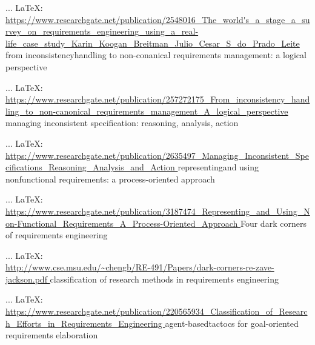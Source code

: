 \begin{thebibliography}{99}
 ... \LaTeX:\\ \url{https://www.researchgate.net/publication/2548016_The_world's_a_stage_a_survey_on_requirements_engineering_using_a_real-life_case_study_Karin_Koogan_Breitman_Julio_Cesar_S_do_Prado_Leite }
from inconsistencyhandling to non-conanical requirements management: a logical perspective

 ... \LaTeX:\\ \url{https://www.researchgate.net/publication/257272175_From_inconsistency_handling_to_non-canonical_requirements_management_A_logical_perspective }
managing inconsistent specification: reasoning, analysis, action

 ... \LaTeX:\\ \url{https://www.researchgate.net/publication/2635497_Managing_Inconsistent_Specifications_Reasoning_Analysis_and_Action  }
representingand using nonfunctional requirements: a process-oriented approach

 ... \LaTeX:\\ \url{https://www.researchgate.net/publication/3187474_Representing_and_Using_Non-Functional_Requirements_A_Process-Oriented_Approach }
Four dark corners of requirements engineering

 ... \LaTeX:\\ \url{ http://www.cse.msu.edu/~chengb/RE-491/Papers/dark-corners-re-zave-jackson.pdf }
classification of research methods in requirements engineering

 ... \LaTeX:\\ \url{https://www.researchgate.net/publication/220565934_Classification_of_Research_Efforts_in_Requirements_Engineering }
agent-basedtactocs for goal-oriented requirements elaboration


\end{thebibliography}
